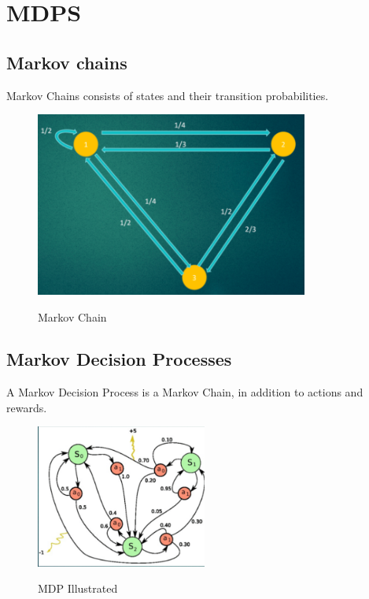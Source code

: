 \section{MDPS}
\label{sec:mdps}

\subsection{Markov chains}

Markov Chains consists of states and their transition probabilities.

\begin{figure}[h]
    \centering
        \includegraphics[width=0.8\textwidth]{figures/MDPS/chain.png}\\
        \caption{Markov Chain}
\end{figure}

\subsection{Markov Decision Processes}

A Markov Decision Process is a Markov Chain, in addition to actions and rewards.

\begin{figure}[h]
    \centering
        \includegraphics[width=0.5\textwidth]{figures/MDPS/mdp.png}\\
        \caption{MDP Illustrated}
\end{figure}

